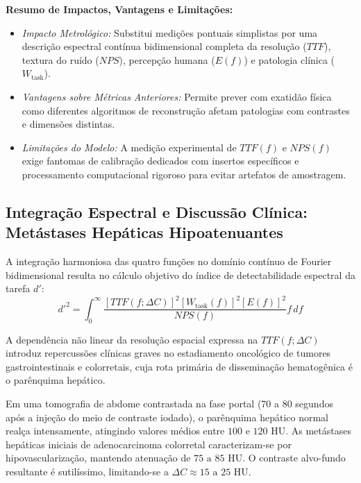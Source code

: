 \documentclass[
  12pt,
  a4paper,
  oneside
]{report}
\begin{document}
\noindent\textbf{Resumo de Impactos, Vantagens e Limitações:}
\begin{itemize}[leftmargin=*,noitemsep]
  \item \emph{Impacto Metrológico:} Substitui medições pontuais simplistas por uma descrição espectral contínua bidimensional completa da resolução ($TTF$), textura do ruído ($NPS$), percepção humana ($E(f)$) e patologia clínica ($W_{\text{task}}$).
  \item \emph{Vantagens sobre Métricas Anteriores:} Permite prever com exatidão física como diferentes algoritmos de reconstrução afetam patologias com contrastes e dimensões distintas.
  \item \emph{Limitações do Modelo:} A medição experimental de $TTF(f)$ e $NPS(f)$ exige fantomas de calibração dedicados com insertos específicos e processamento computacional rigoroso para evitar artefatos de amostragem.
\end{itemize}

\subsection{Integração Espectral e Discussão Clínica: Metástases Hepáticas Hipoatenuantes}
\label{subsec:integracao_espectral_e_discussao_clinica_figado}
A integração harmoniosa das quatro funções no domínio contínuo de Fourier bidimensional resulta no cálculo objetivo do índice de detectabilidade espectral da tarefa $d'$:
\begin{equation}
  d'^2 = \int_0^{\infty} \frac{\left[ TTF(f; \Delta C) \right]^2 \left[ W_{\text{task}}(f) \right]^2 \left[ E(f) \right]^2}{NPS(f)} f \, df
  \label{eq:dprime_espectral_integracao_aapm}
\end{equation}

A dependência não linear da resolução espacial expressa na $TTF(f; \Delta C)$ introduz repercussões clínicas graves no estadiamento oncológico de tumores gastrointestinais e colorretais, cuja rota primária de disseminação hematogênica é o parênquima hepático.

Em uma tomografia de abdome contrastada na fase portal (70 a 80 segundos após a injeção do meio de contraste iodado), o parênquima hepático normal realça intensamente, atingindo valores médios entre $100\text{ e } 120\text{ HU}$. As metástases hepáticas iniciais de adenocarcinoma colorretal caracterizam-se por hipovascularização, mantendo atenuação de $75\text{ a } 85\text{ HU}$. O contraste alvo-fundo resultante é sutilíssimo, limitando-se a $\Delta C \approx 15\text{ a } 25\text{ HU}$.
\end{document}
